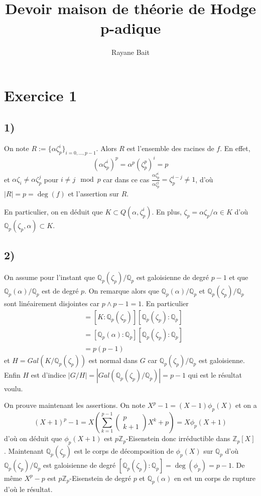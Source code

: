 \documentclass[a4paper,12pt]{article}
\title{Devoir maison de théorie de Hodge p-adique}
\author{Rayane Bait}
\date{ }
\newcommand{\Z}{\mathbb{Z}}
\newcommand{\Q}{\mathbb{Q}}
\theoremstyle{plain}
\theoremstyle{definition}
\theoremstyle{remark}
\begin{document}
\maketitle

\section*{Exercice 1}
\subsection*{1)}
On note $R:=\{\alpha\zeta_p^i\}_{i=0,\ldots, p-1}$. Alors
$R$ est l'ensemble des racines de $f$. En effet,
\[(\alpha\zeta_p^i)^p=\alpha^p(\zeta_p^p)^i=p\] et
$\alpha\zeta_i\ne\alpha\zeta_p^j$ pour $i\ne j\mod p$ car
dans ce cas $\frac{\alpha\zeta_p^i}{\alpha\zeta_p^j}=\zeta_p^{i-j}
\ne 1$,
d'où $|R|=p=\deg(f)$ et l'assertion sur $R$.

En particulier, on en déduit que
$K\subset Q(\alpha,\zeta_p^i)$. En plus, $\zeta_p=\alpha\zeta_p/
\alpha\in K$
d'où $\Q_p(\zeta_p,\alpha)\subset K$.

\subsection*{2)}
On assume pour l'instant que $\Q_p(\zeta_p)/\Q_p$ est 
galoisienne de degré 
$p-1$ et que $\Q_p(\alpha)/\Q_p$ est de degré $p$. On remarque 
alors que
$\Q_p(\alpha)/\Q_p$ et $\Q_p(\zeta_p)/\Q_p$ sont linéairement
disjointes car $p\wedge p-1=1$. En particulier 
\begin{align*}
	[K:\Q_p]&=[K:\Q_p(\zeta_p)][\Q_p(\zeta_p):\Q_p]\\
		&=[\Q_p(\alpha):\Q_p][\Q_p(\zeta_p):\Q_p]\\
		&=p(p-1)
\end{align*}
et $H=Gal(K/\Q_p(\zeta_p))$ est normal dans $G$ car 
$\Q_p(\zeta_p)/\Q_p$ est galoisienne. Enfin $H$ est d'indice 
$|G/H|=|Gal(\Q_p(\zeta_p)/\Q_p)|=p-1$ qui est le résultat voulu. 

On prouve maintenant les assertions. On note $X^p-1=(X-1)\phi_p(X)$
et on a 
\[(X+1)^p-1=X(\sum_{k=1}^{p-1}\begin{pmatrix}p\\ k+1\end{pmatrix}
X^k +p)=X\phi_p(X+1)\]
d'où on déduit que $\phi_p(X+1)$ est $p\Z_p$-Eisenstein donc
irréductible dans $\Z_p[X]$. Maintenant $\Q_p(\zeta_p)$ est le
corps de décomposition de $\phi_p(X)$ sur $\Q_p$ d'où 
$\Q_p(\zeta_p)/\Q_p$ est galoisienne de degré
$[\Q_p(\zeta_p):\Q_p]=\deg(\phi_p)=p-1$. De même $X^p-p$ est
$p\Z_p$-Eisenstein de degré $p$ et $\Q_p(\alpha)$ en est un
corps de rupture d'où le résultat.
\end{document}

